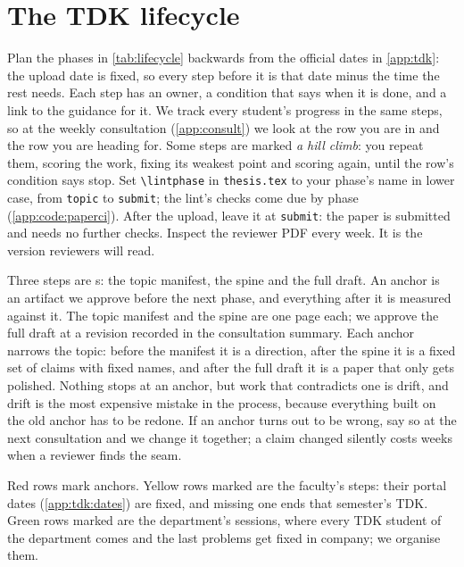 \chapter{The TDK lifecycle}\label{app:lifecycle}
Plan the phases in \cref{tab:lifecycle} backwards from the official dates in \cref{app:tdk}: the upload date is fixed, so every step before it is that date minus the time the rest needs. Each step has an owner, a condition that says when it is done, and a link to the guidance for it.
We track every student's progress in the same steps, so at the weekly consultation (\cref{app:consult}) we look at the row you are in and the row you are heading for. Some steps are marked \emph{a hill climb}: you repeat them, scoring the work, fixing its weakest point and scoring again, until the row's condition says stop.
Set \texttt{\textbackslash lintphase} in \texttt{thesis.tex} to your phase's name in lower case, from \texttt{topic} to \texttt{submit}; the lint's checks come due by phase (\cref{app:code:paperci}). After the upload, leave it at \texttt{submit}: the paper is submitted and needs no further checks.
Inspect the reviewer PDF every week. It is the version reviewers will read.

Three steps are \anchor{}s: the topic manifest, the spine and the full draft. An anchor is an artifact we approve before the next phase, and everything after it is measured against it. The topic manifest and the spine are one page each; we approve the full draft at a revision recorded in the consultation summary. Each anchor narrows the topic: before the manifest it is a direction, after the spine it is a fixed set of claims with fixed names, and after the full draft it is a paper that only gets polished. Nothing stops at an anchor, but work that contradicts one is drift, and drift is the most expensive mistake in the process, because everything built on the old anchor has to be redone. If an anchor turns out to be wrong, say so at the next consultation and we change it together; a claim changed silently costs weeks when a reviewer finds the seam.

Red rows mark anchors. Yellow rows marked \official{} are the faculty's steps: their portal dates (\cref{app:tdk:dates}) are fixed, and missing one ends that semester's TDK. Green rows marked \department{} are the department's sessions, where every TDK student of the department comes and the last problems get fixed in company; we organise them.

